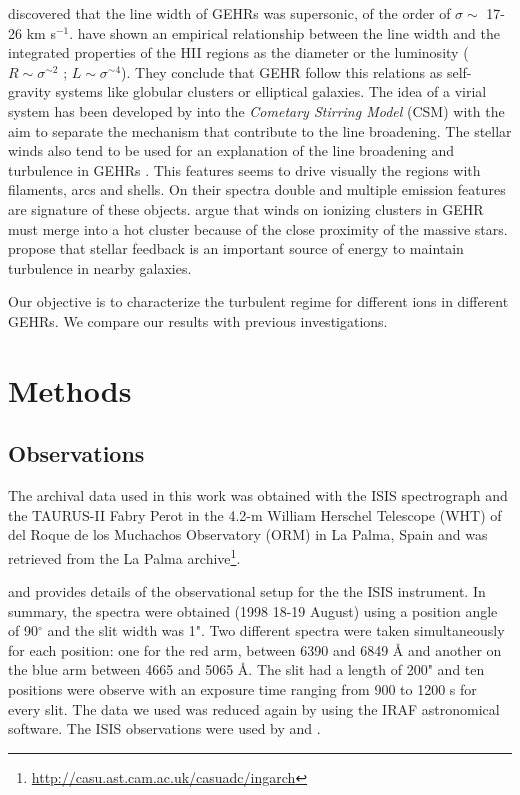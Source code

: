 \documentclass[fleqn,usenatbib]{mnras}
\newcommand\kms{$^{-1}$}
\begin{document}
\citet{smith1970} discovered that the line width of GEHRs was supersonic, of the order of $\sigma \sim$ 17-26 km s\kms. \citet{melnick1977,terlevich1981} have shown an empirical relationship between the line width and the integrated properties of the HII regions as the diameter or the luminosity ($R \sim \sigma ^{\sim 2}$ ; $L \sim \sigma ^{\sim 4}$). They conclude that GEHR  follow this relations as self-gravity systems like globular clusters or elliptical galaxies. The idea of a virial system has been developed by \citet{1993ApJ...418..767T,munoz1996} into the \textit{Cometary Stirring Model} (CSM) with the aim to separate the mechanism that contribute to the line broadening. The stellar winds also tend to be used for an explanation of the line broadening and turbulence in GEHRs \citep{1994ApJ...425..720C}. This features seems to drive visually the regions with filaments, arcs and shells. On their spectra double and multiple emission features are signature of these objects. \cite{2020MNRAS.494...97S} argue that winds on ionizing clusters in GEHR must merge into a hot cluster because of the close proximity of the massive stars. \cite{2019ApJ...871...17U} propose that stellar feedback is an important source of energy to maintain turbulence in nearby galaxies.

Our objective is to characterize the turbulent regime for different ions in different GEHRs.  We compare our results with previous investigations.


\section{Methods}\label{sec:met}

\subsection{Observations}\label{sec:obs}

The archival data used in this work was obtained with the ISIS spectrograph and the TAURUS-II Fabry Perot in the 4.2-m William Herschel Telescope (WHT) of del Roque de los Muchachos Observatory (ORM) in La Palma, Spain and was retrieved from the La Palma archive\footnote{\url{http://casu.ast.cam.ac.uk/casuadc/ingarch}}.

\citet{2000PASP..112.1138M} and \citep{maiz2004} provides details of the observational setup for the the ISIS instrument. In summary, the spectra were obtained (1998 18-19 August) using a position angle of 90$^{\circ}$ and the slit width was 1". Two different spectra were taken simultaneously for each position: one for the red arm, between 6390 and 6849 \r{A} and another on the blue arm between 4665 and 5065 \r{A}. The slit had a length of 200" and ten  positions  were observe with an exposure time ranging from 900 to 1200 s for every slit. The  data we used was reduced again by \citet{jen2013} using the IRAF \citep{1999ascl.soft11002N} astronomical software. The ISIS observations were used by \citet{TT2000} and \citet{maiz2004}.  
\end{document}

